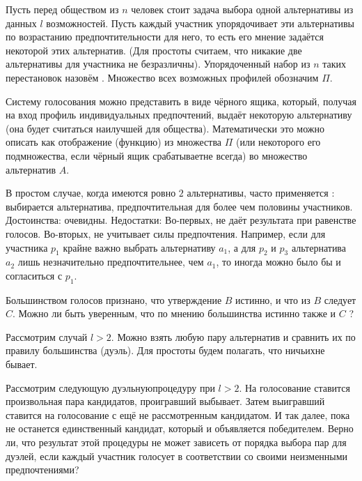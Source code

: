 \documentclass[a4paper,11pt]{article}
\begin{document}


Пусть перед обществом из $n$ человек стоит задача выбора одной
альтернативы из данных $l$ возможностей. Пусть каждый участник
упорядочивает эти альтернативы по возрастанию предпочтительности для
него, то есть его мнение задаётся некоторой  этих
альтернатив. (Для простоты считаем, что никакие две альтернативы для
участника не безразличны). Упорядоченный набор из $n$ таких
перестановок назовём .
Множество всех возможных профилей обозначим $\Pi$.

Систему голосования можно представить в виде чёрного ящика, который,
получая на вход профиль индивидуальных предпочтений, выдаёт
некоторую альтернативу (она будет считаться  наилучшей для
общества). Математически это можно описать как отображение
(функцию) из множества  $\Pi$ (или некоторого его подмножества, если
чёрный ящик  срабатывает не всегда) во множество альтернатив
$A$.

В простом случае, когда имеются ровно $2$ альтернативы, часто
применяется : выбирается
альтернатива, предпочтительная для более чем половины участников.
Достоинства: очевидны. Недостатки: Во-первых, не даёт результата при
равенстве голосов. Во-вторых, не учитывает  силы предпочтения.
Например, если для участника $p_1$ крайне важно выбрать альтернативу
$a_1$, а для $p_2$ и $p_3$ альтернатива $a_2$ лишь незначительно
предпочтительнее, чем $a_1$, то иногда можно было бы и согласиться с
$p_1$.

 Большинством голосов признано, что утверждение $B$ истинно,
и что из $B$ следует $C$. Можно ли быть уверенным, что по мнению
большинства истинно также и $C$ ? 

Рассмотрим случай $l > 2$. Можно взять любую пару альтернатив и
сравнить их по правилу большинства ( дуэль). Для простоты
будем полагать, что  ничьих не бывает.

 \label{duel} Рассмотрим следующую  дуэльную процедуру
при $l > 2$. На голосование ставится произвольная пара кандидатов,
проигравший выбывает. Затем выигравший ставится на голосование с ещё
не рассмотренным кандидатом. И так далее, пока не останется
единственный кандидат, который и объявляется победителем. Верно ли,
что результат этой процедуры не может зависеть от порядка выбора пар
для  дуэлей, если каждый участник голосует в соответствии со
своими неизменными предпочтениями? 
\end{document}
